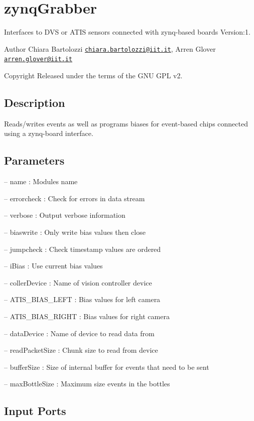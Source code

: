 \hypertarget{group__zynqGrabber}{}\section{zynq\+Grabber}
\label{group__zynqGrabber}
Interfaces to D\+VS or A\+T\+IS sensors connected with zynq-\/based boards Version\+:1. \begin{DoxyAuthor}{Author}
Chiara Bartolozzi \href{mailto:chiara.bartolozzi@iit.it}{\tt chiara.\+bartolozzi@iit.\+it}, Arren Glover \href{mailto:arren.glover@iit.it}{\tt arren.\+glover@iit.\+it} ~\newline
 
\end{DoxyAuthor}
\begin{DoxyCopyright}{Copyright}
Released under the terms of the G\+NU G\+PL v2. 
\end{DoxyCopyright}
\hypertarget{group__zynqGrabber_intro_sec}{}\subsection{Description}\label{group__zynqGrabber_intro_sec}
Reads/writes events as well as programs biases for event-\/based chips connected using a zynq-\/board interface.\hypertarget{group__zynqGrabber_parameters_sec}{}\subsection{Parameters}\label{group__zynqGrabber_parameters_sec}

\begin{DoxyItemize}
\item -- name \+: Modules name
\item -- errorcheck \+: Check for errors in data stream
\item -- verbose \+: Output verbose information
\item -- biaswrite \+: Only write bias values then close
\item -- jumpcheck \+: Check timestamp values are ordered
\item -- i\+Bias \+: Use current bias values
\item -- coller\+Device \+: Name of vision controller device
\item -- A\+T\+I\+S\+\_\+\+B\+I\+A\+S\+\_\+\+L\+E\+FT \+: Bias values for left camera
\item -- A\+T\+I\+S\+\_\+\+B\+I\+A\+S\+\_\+\+R\+I\+G\+HT \+: Bias values for right camera
\item -- data\+Device \+: Name of device to read data from
\item -- read\+Packet\+Size \+: Chunk size to read from device
\item -- buffer\+Size \+: Size of internal buffer for events that need to be sent
\item -- max\+Bottle\+Size \+: Maximum size events in the bottles 
\end{DoxyItemize}\hypertarget{group__zynqGrabber_inputports_sec}{}\subsection{Input Ports}\label{group__zynqGrabber_inputports_sec}

